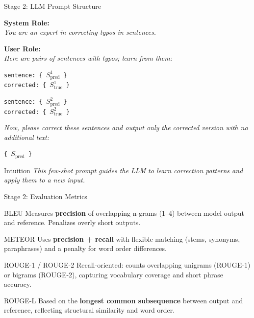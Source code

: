 \documentclass[aspectratio=169]{beamer}
\begin{document}
\begin{frame}{Stage 2: LLM Prompt Structure}
    \small
    
    \textbf{System Role:} \\
    \textit{You are an expert in correcting typos in sentences.}
    
    \vspace{1em}
    
    \textbf{User Role:} \\
    \textit{Here are pairs of sentences with typos; learn from them:}
    
    \vspace{0.5em}
    
    \texttt{sentence: \{ $S^{1}_{\text{pred}}$ \}} \\
    \texttt{corrected: \{ $S^{1}_{\text{true}}$ \}}
    
    \vspace{0.5em}
    
    \texttt{sentence: \{ $S^{2}_{\text{pred}}$ \}} \\
    \texttt{corrected: \{ $S^{2}_{\text{true}}$ \}}
    
    \vspace{1em}
    
    \textit{Now, please correct these sentences and output only the corrected version with no additional text:}
    
    \vspace{0.2em}
    \texttt{\{ $S_{\text{pred}}$ \}}
    
    \vspace{1em}
    \begin{block}{Intuition}
        \textit{This few-shot prompt guides the LLM to learn correction patterns and apply them to a new input.}
    \end{block}
\end{frame}
\begin{frame}{Stage 2: Evaluation Metrics}
    \small
    \begin{block}{BLEU}
        Measures \textbf{precision} of overlapping n-grams (1–4) between model output and reference.
        Penalizes overly short outputs.
    \end{block}
    \begin{block}{METEOR}
        Uses \textbf{precision + recall} with flexible matching (stems, synonyms, paraphrases) and a penalty for word order differences.
    \end{block}
    \begin{block}{ROUGE-1 / ROUGE-2}
        Recall-oriented: counts overlapping unigrams (ROUGE-1) or bigrams (ROUGE-2), capturing vocabulary coverage and short phrase accuracy.
    \end{block}
    \begin{block}{ROUGE-L}
        Based on the \textbf{longest common subsequence} between output and reference, reflecting structural similarity and word order.
    \end{block}
\end{frame}
\end{document}
